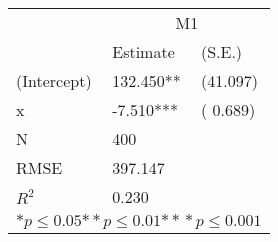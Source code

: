 \begin{tabular}{*{3}{l}}
\hline
                  & \multicolumn{2}{c}{M1}   \tabularnewline
                   &Estimate  &(S.E.)  \tabularnewline
 \hline
 \hline
   (Intercept)     &132.450**   &   (41.097) \tabularnewline
   x               &-7.510***   &   ( 0.689) \tabularnewline
 \hline
 N                 &400       &        \tabularnewline
 RMSE             &397.147         & \tabularnewline
 $R^2$             &0.230         & \tabularnewline
 \hline
\hline
 
 \multicolumn{3}{c}{${*  p}\le 0.05$${*\!\!*  p}\le 0.01$${*\!\!*\!\!*  p}\le 0.001$}\tabularnewline
 \end{tabular}